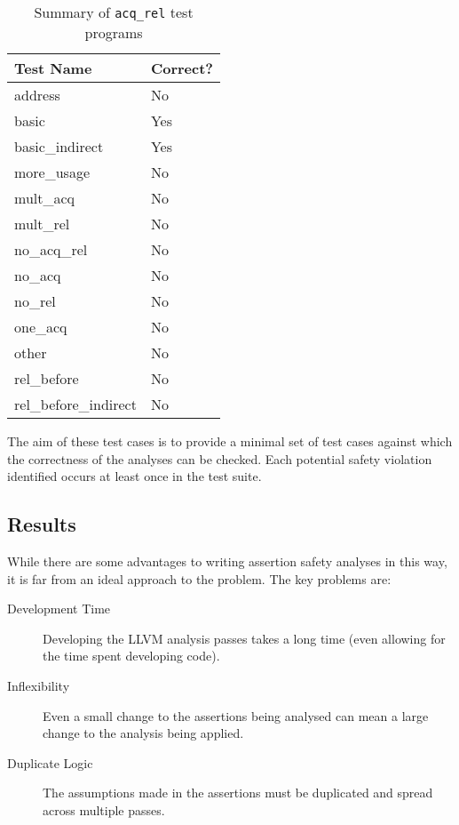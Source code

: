 \begin{table}[ht]
  \centering
  \begin{tabularx}{\textwidth}{Z | Z}
    \toprule
    \textbf{Test Name} & \textbf{Correct?} \\
    \midrule
    address & No \\
    basic & Yes \\
    basic\_indirect & Yes \\
    more\_usage & No \\
    mult\_acq & No \\
    mult\_rel & No \\
    no\_acq\_rel & No \\
    no\_acq & No \\
    no\_rel & No \\
    one\_acq & No \\
    other & No \\
    rel\_before & No \\
    rel\_before\_indirect & No \\
    \bottomrule
  \end{tabularx}
  \caption{Summary of \texttt{acq_rel} test programs}
\end{table}

The aim of these test cases is to provide a minimal set of test cases
against which the correctness of the analyses can be checked. Each
potential safety violation identified occurs at least once in the test
suite.

\subsection{Results}

While there are some advantages to writing assertion safety analyses in
this way, it is far from an ideal approach to the problem. The key
problems are:
\begin{description}
  \item[Development Time] Developing the LLVM analysis passes takes a
    long time (even allowing for the time spent developing
     code).
  \item[Inflexibility] Even a small change to the assertions being
    analysed can mean a large change to the analysis being applied.
  \item[Duplicate Logic] The assumptions made in the assertions must be
    duplicated and spread across multiple passes.
\end{description}

